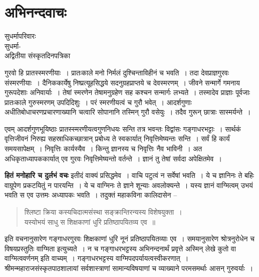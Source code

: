 {\fontsize{15}{17}\selectfont
\presetvalues
\chapter{अभिनन्दवाचः}

\begin{center}
\smallskip
सुधर्मापरिवारः\\
सुधर्मा-\\
अद्वितीया संस्कृतदिनपत्रिका
\addrule
\end{center}

गुरवो हि प्रातस्स्मरणीयाः~। प्रातःकाले मनो निर्मलं दुश्चिन्ताविहीनं च भवति~। तदा देवप्राज्ञगुरवः संस्मरणीयाः~। दैनिककार्येषु निष्प्रत्यूहसिद्धये सदनुग्रहप्राप्तये च देवस्मरणम्~। जीवने सन्मार्गे गमनाय गुरूपदेशाः अनिवार्याः~। तेषां स्मरणेन तेषामनुग्रहेण सह कश्चन सन्मार्गः लभ्यते~। तस्मादेव प्राज्ञाः पूर्वजाः प्रातःकाले गुरुस्मरणम् उपदिदिशुः~। परं स्मरणीयत्वं च गुरौ भवेत्~। आदर्शगुणाः अधीतिबोधाचरणप्रचारणाख्यानि चत्वारि सोपानानि तस्मिन् गुरौ वसेयुः~। तदैव गुरून् छात्राः सास्मर्यन्ते~। 

एवम् आदर्शगुणभूयिष्ठाः प्रातस्स्मरणीयत्वगुणनिधयः सन्ति तत्र भवन्तः विद्वांसः गङ्गाधरभट्टाः~। सार्थकं वृत्तिजीवनं निरुह्य सहस्राधिकच्छात्रान् प्रबोध्य ते स्वकार्यात् निवृत्तिमेष्यन्तः सन्ति~। सर्वं हि कार्यं समयसापेक्षम्~। निवृत्तिः कार्यस्यैव~। किन्तु ज्ञानस्य च निवृत्तिः नैव भाविनी~। अत अधिकृताध्यापककार्यात् एव गुरवः निवृत्तिमेष्यन्तो वर्तन्ते~। ज्ञानं तु तेषां सर्वदा अपेक्षितमेव~।

\textbf{हितं मनोहारि च दुर्लभं वचः} इतीदं वाक्यं प्रसिद्धमेव~। वाचि पटुत्वं न सर्वेषां भवति~। ये च ज्ञानिनः ते बहिः वाग्रूपेण प्रकटयितुं न पारयन्ति~। ये च वाग्मिनः ते ज्ञाने शून्याः अवलोक्यन्ते~। यस्य ज्ञानं वाग्मित्वम् उभयं भवति स एव उत्तमः अध्यापकः भवति~। तदुक्तं महाकविना कालिदासेन --

\begin{verse}
श्लिष्टा क्रिया कस्यचिदात्मसंस्था सङ्क्रान्तिरन्यस्य विशेषयुक्ता~।\\
यस्योभयं साधु स शिक्षकाणां धुरि प्रतिष्ठापयितव्य एव~॥
\end{verse}

इति वचनानुसारेण गङ्गाधरगुरवः शिक्षकाणां धुरि नूनं प्रतिष्ठापयितव्याः एव~। समयानुसारेण श्रोत्रनुरोधेन च विषयप्रस्तुतिः वाग्मिता इत्युच्यते~। न च गङ्गाधरभट्टस्य अभिनन्दनार्थं प्रवृत्ते अस्मिन् लेखे कुतो वा वाग्मित्ववर्णनम् इति वाच्यम्~। गङ्गाधरभट्टस्य वाग्मिपदपर्यायत्वस्वीकरणात्~। श्रीमन्महाराजसंस्कृतपाठशालायां सर्वशास्त्राणां सामान्यविषयाणां च व्याख्याने परमसमर्थाः आसन् गुरुवर्याः~। 

}
